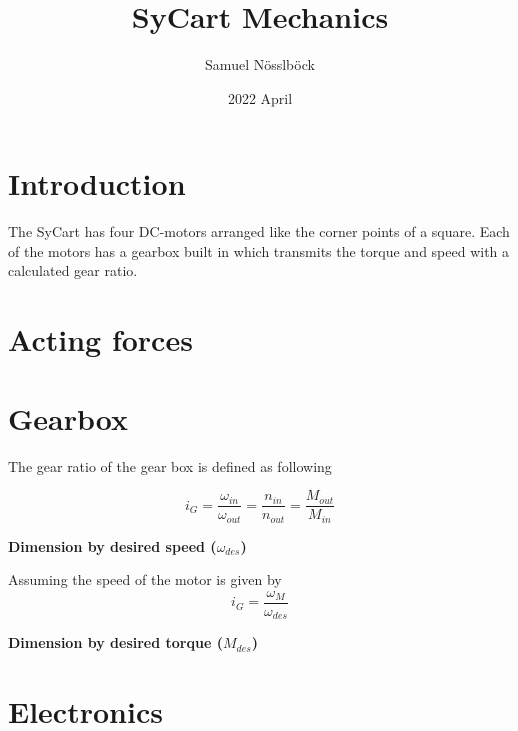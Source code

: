 \documentclass{article}
\title{SyCart Mechanics}
\author{Samuel Nösslböck}
\date{2022 April}
\begin{document}
\maketitle

\section{Introduction}

    The SyCart has four DC-motors arranged like the corner points of a square. Each of the motors has a gearbox built in which transmits the torque and speed with a calculated gear ratio.

\section{Acting forces}


\section{Gearbox}
    The gear ratio of the gear box is defined as following
    
    \begin{equation}
        i_G = \frac{\omega_{in}}{\omega_{out}} = \frac{n_{in}}{n_{out}} = \frac{M_{out}}{M_{in}}
    \end{equation}
    
    \textbf{Dimension by desired speed ($\omega_{des}$)}
    
    Assuming the speed of the motor is given by 
    \begin{equation}
        i_G = \frac{\omega_M}{\omega_{des}}
    \end{equation}
    
    \textbf{Dimension by desired torque ($M_{des}$)}
    


\section{Electronics}
\end{document}
